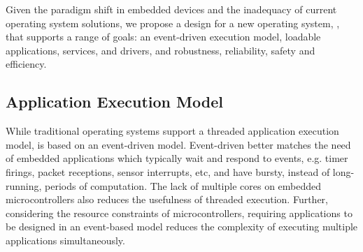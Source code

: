 
Given the paradigm shift in embedded devices and the inadequacy of current operating
system solutions, we propose a design for a new operating system,
\name, that supports a range of goals: an event-driven execution model,
loadable applications, services, and drivers, and
robustness, reliability, safety and efficiency.




\subsection{Application Execution Model}
\label{sec:os:execution}

While traditional operating systems support a threaded application execution
model, \name is based on an event-driven model. Event-driven better matches
the need of embedded applications which typically wait and respond to
events, e.g. timer firings, packet receptions, sensor interrupts, etc, and
have bursty, instead of long-running, periods of computation. The lack of
multiple cores on embedded microcontrollers also reduces the usefulness
of threaded execution. Further, considering the resource constraints
of microcontrollers, requiring applications to be designed in an event-based
model reduces the complexity of executing multiple applications simultaneously.






